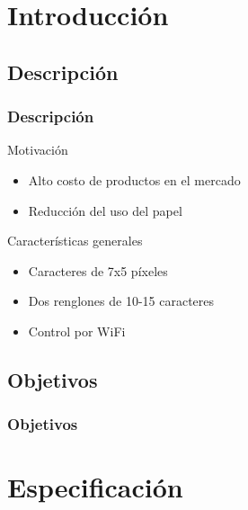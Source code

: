 \section{Introducción} 

\subsection{Descripción}
 

\begin{frame}
	\frametitle{Descripción}
	
		\begin{block}{Motivación}
			\begin{itemize}
				\item Alto costo de productos en el mercado
				\item Reducción del uso del papel
			\end{itemize}
		\end{block}

		\begin{block}{Características generales}
			\begin{itemize}
				\item Caracteres de 7x5 píxeles
				\item Dos renglones de 10-15 caracteres
				\item Control por WiFi
			\end{itemize}
		\end{block}

\end{frame}

\subsection{Objetivos}
\begin{frame}
	\frametitle{Objetivos}

\end{frame}

\section{Especificación}

